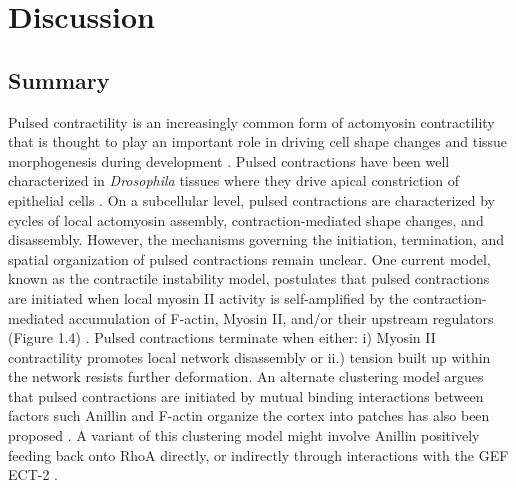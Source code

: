 \documentclass{ucetd}
\begin{document}
\chapter{Discussion}















\section{Summary}
Pulsed contractility is an increasingly common form of actomyosin contractility that is thought to play an important role in driving cell shape changes and tissue morphogenesis during development \cite{Gorfinkiel:2016bv}.  Pulsed contractions have been well characterized in \textit{Drosophila} tissues where they drive apical constriction of epithelial cells \cite{Rauzi:2011bk}.  On a subcellular level, pulsed contractions are characterized by cycles of local actomyosin assembly, contraction-mediated shape changes, and disassembly.  However, the mechanisms governing the initiation, termination, and spatial organization of pulsed contractions remain unclear.  One current model, known as the contractile instability model, postulates that pulsed contractions are initiated when local myosin II activity is self-amplified by the contraction-mediated accumulation of F-actin, Myosin II, and/or their upstream regulators (Figure 1.4) \cite{Bois:2011kx, Kumar:2014ux}.  Pulsed contractions terminate when either: i) Myosin II contractility promotes local network disassembly or ii.) tension built up within the network resists further deformation.  An alternate clustering model argues that pulsed contractions are initiated by mutual binding interactions between factors such Anillin and F-actin organize the cortex into patches has also been proposed \cite{Maddox:2005gd}.  A variant of this clustering model might involve Anillin positively feeding back onto RhoA directly, or indirectly through interactions with the GEF ECT-2 \cite{Piekny:2008jf, Frenette:2012do}. 
\end{document}
